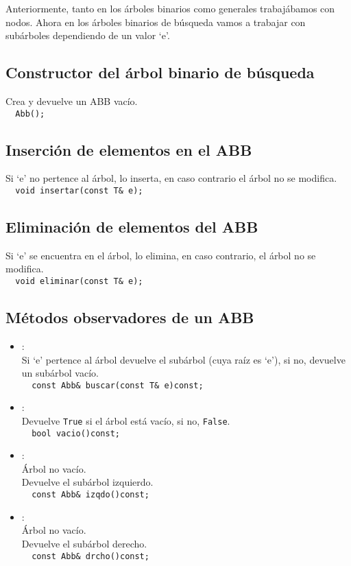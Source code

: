 Anteriormente, tanto en los árboles binarios como generales trabajábamos con nodos. Ahora en los árboles binarios de búsqueda vamos a trabajar con subárboles dependiendo de un valor `e'.

\subsection*{Constructor del árbol binario de búsqueda}
 Crea y devuelve un ABB vacío.\\
\verb|  Abb();|
\subsection*{Inserción de elementos en el ABB}
 Si `e' no pertence al árbol, lo inserta, en caso contrario el árbol no se modifica.\\
\verb|  void insertar(const T& e);| 
\subsection*{Eliminación de elementos del ABB}
 Si `e' se encuentra en el árbol, lo elimina, en caso contrario, el árbol no se modifica.\\
\verb|  void eliminar(const T& e);|
\subsection*{Métodos observadores de un ABB}
\begin{itemize}
  \item {}:\\
   Si `e' pertence al árbol devuelve el subárbol (cuya raíz es `e'), si no, devuelve un subárbol vacío.\\
  \verb|  const Abb& buscar(const T& e)const;|
  \item {}:\\ 
   Devuelve \texttt{True} si el árbol está vacío, si no, \texttt{False}.\\
  \verb|  bool vacio()const;|
  \item {}:\\
   Árbol no vacío.\\
   Devuelve el subárbol izquierdo.\\
  \verb|  const Abb& izqdo()const;|
  \item {}:\\
   Árbol no vacío.\\
   Devuelve el subárbol derecho.\\
  \verb|  const Abb& drcho()const;|
\end{itemize}